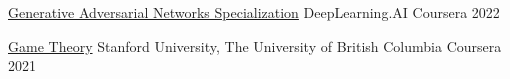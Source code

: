 
\newcommand{\dlspec}{\href{https://www.coursera.org/account/accomplishments/specialization/certificate/3DWHZC46YSCK}{Deep Learning Specialization}}

\newcommand{\ganspec}{\href{https://www.coursera.org/account/accomplishments/specialization/certificate/WT5VCNDDCB7V}{GANs Specialization}}


\begin{cvhonors}


  \cvhonor
    {\href{https://www.coursera.org/account/accomplishments/specialization/certificate/WT5VCNDDCB7V}{Generative Adversarial Networks Specialization}} %
    {DeepLearning.AI} %
    {Coursera} %
    {2022} %

%
%


  \cvhonor
    {\href{https://www.coursera.org/account/accomplishments/certificate/ZVWNNHWAJUWC}{Game Theory}} %
    {Stanford University, The University of British Columbia} %
    {Coursera} %
    {2021} %


\end{cvhonors}
